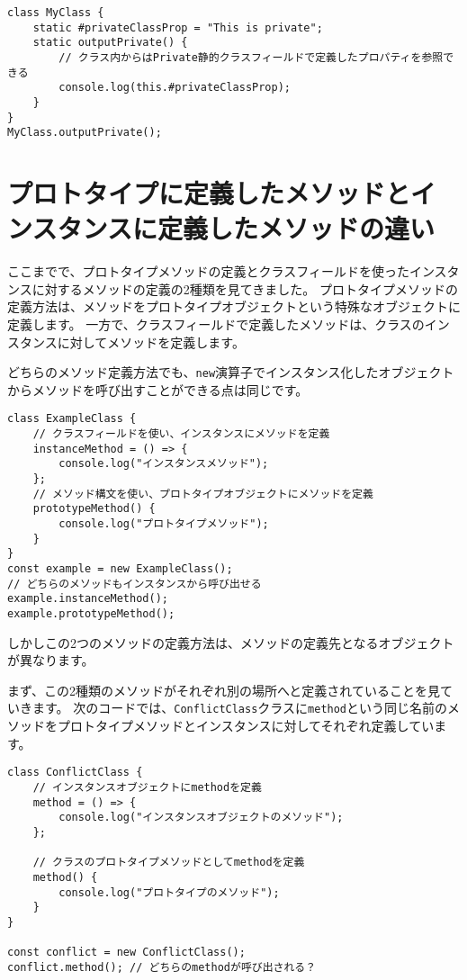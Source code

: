 \begin{lstlisting}
class MyClass {
    static #privateClassProp = "This is private";
    static outputPrivate() {
        // クラス内からはPrivate静的クラスフィールドで定義したプロパティを参照できる
        console.log(this.#privateClassProp);
    }
}
MyClass.outputPrivate();
\end{lstlisting}

\hypertarget{two-instance-method-definition}{%
\section{プロトタイプに定義したメソッドとインスタンスに定義したメソッドの違い}\label{two-instance-method-definition}}

ここまでで、プロトタイプメソッドの定義とクラスフィールドを使ったインスタンスに対するメソッドの定義の2種類を見てきました。
プロトタイプメソッドの定義方法は、メソッドをプロトタイプオブジェクトという特殊なオブジェクトに定義します。
一方で、クラスフィールドで定義したメソッドは、クラスのインスタンスに対してメソッドを定義します。

どちらのメソッド定義方法でも、\texttt{new}演算子でインスタンス化したオブジェクトからメソッドを呼び出すことができる点は同じです。

\begin{lstlisting}
class ExampleClass {
    // クラスフィールドを使い、インスタンスにメソッドを定義
    instanceMethod = () => {
        console.log("インスタンスメソッド");
    };
    // メソッド構文を使い、プロトタイプオブジェクトにメソッドを定義
    prototypeMethod() {
        console.log("プロトタイプメソッド");
    }
}
const example = new ExampleClass();
// どちらのメソッドもインスタンスから呼び出せる
example.instanceMethod();
example.prototypeMethod();
\end{lstlisting}

しかしこの2つのメソッドの定義方法は、メソッドの定義先となるオブジェクトが異なります。

まず、この2種類のメソッドがそれぞれ別の場所へと定義されていることを見ていきます。
次のコードでは、\texttt{ConflictClass}クラスに\texttt{method}という同じ名前のメソッドをプロトタイプメソッドとインスタンスに対してそれぞれ定義しています。

\begin{lstlisting}
class ConflictClass {
    // インスタンスオブジェクトにmethodを定義
    method = () => {
        console.log("インスタンスオブジェクトのメソッド");
    };

    // クラスのプロトタイプメソッドとしてmethodを定義
    method() {
        console.log("プロトタイプのメソッド");
    }
}

const conflict = new ConflictClass();
conflict.method(); // どちらのmethodが呼び出される？
\end{lstlisting}


